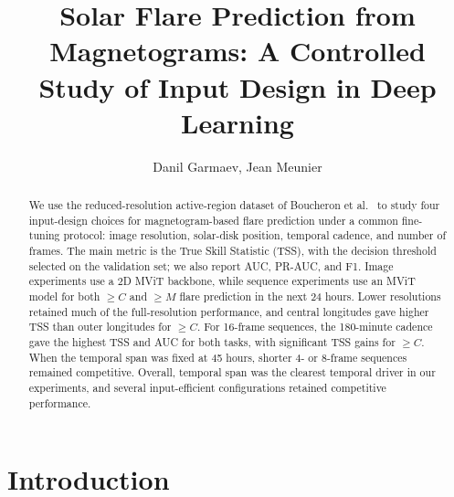 \documentclass[runningheads]{llncs}
\begin{document}
\newcommand{\best}[1]{\bm{#1}}

\title{Solar Flare Prediction from Magnetograms: A Controlled Study of Input Design in Deep Learning}


\author{Danil Garmaev, Jean Meunier}


\maketitle

\begin{abstract}

We use the reduced-resolution active-region dataset of Boucheron et al.~\cite{ref_boucheron} to study four input-design choices for magnetogram-based flare prediction under a common fine-tuning protocol: image resolution, solar-disk position, temporal cadence, and number of frames. The main metric is the True Skill Statistic (TSS), with the decision threshold selected on the validation set; we also report AUC, PR-AUC, and F1. Image experiments use a 2D MViT backbone, while sequence experiments use an MViT model for both $\geq C$ and $\geq M$ flare prediction in the next 24 hours. Lower resolutions retained much of the full-resolution performance, and central longitudes gave higher TSS than outer longitudes for $\geq C$. For 16-frame sequences, the 180-minute cadence gave the highest TSS and AUC for both tasks, with significant TSS gains for $\geq C$. When the temporal span was fixed at 45 hours, shorter 4- or 8-frame sequences remained competitive. Overall, temporal span was the clearest temporal driver in our experiments, and several input-efficient configurations retained competitive performance.




\end{abstract}

\section{Introduction}
\end{document}
